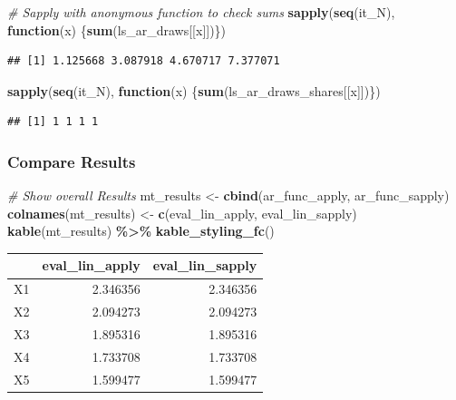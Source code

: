 \documentclass[
]{book}
\newenvironment{Shaded}{\begin{snugshade}}{\end{snugshade}}
\newcommand{\CommentTok}[1]{\textcolor[rgb]{0.56,0.35,0.01}{\textit{#1}}}
\newcommand{\ControlFlowTok}[1]{\textcolor[rgb]{0.13,0.29,0.53}{\textbf{#1}}}
\newcommand{\KeywordTok}[1]{\textcolor[rgb]{0.13,0.29,0.53}{\textbf{#1}}}
\newcommand{\NormalTok}[1]{#1}
\newcommand{\OperatorTok}[1]{\textcolor[rgb]{0.81,0.36,0.00}{\textbf{#1}}}
\newcommand{\StringTok}[1]{\textcolor[rgb]{0.31,0.60,0.02}{#1}}
\begin{document}
\begin{Shaded}
\begin{Highlighting}[]
\CommentTok{\# Sapply with anonymous function to check sums}
\KeywordTok{sapply}\NormalTok{(}\KeywordTok{seq}\NormalTok{(it\_N), }\ControlFlowTok{function}\NormalTok{(x) \{}\KeywordTok{sum}\NormalTok{(ls\_ar\_draws[[x]])\})}
\end{Highlighting}
\end{Shaded}

\begin{verbatim}
## [1] 1.125668 3.087918 4.670717 7.377071
\end{verbatim}

\begin{Shaded}
\begin{Highlighting}[]
\KeywordTok{sapply}\NormalTok{(}\KeywordTok{seq}\NormalTok{(it\_N), }\ControlFlowTok{function}\NormalTok{(x) \{}\KeywordTok{sum}\NormalTok{(ls\_ar\_draws\_shares[[x]])\})}
\end{Highlighting}
\end{Shaded}

\begin{verbatim}
## [1] 1 1 1 1
\end{verbatim}

\hypertarget{compare-results}{%
\subsubsection{Compare Results}\label{compare-results}}

\begin{Shaded}
\begin{Highlighting}[]
\CommentTok{\# Show overall Results}
\NormalTok{mt\_results \textless{}{-}}\StringTok{ }\KeywordTok{cbind}\NormalTok{(ar\_func\_apply, ar\_func\_sapply)}
\KeywordTok{colnames}\NormalTok{(mt\_results) \textless{}{-}}\StringTok{ }\KeywordTok{c}\NormalTok{(}\StringTok{\textquotesingle{}eval\_lin\_apply\textquotesingle{}}\NormalTok{, }\StringTok{\textquotesingle{}eval\_lin\_sapply\textquotesingle{}}\NormalTok{)}
\KeywordTok{kable}\NormalTok{(mt\_results) }\OperatorTok{\%\textgreater{}\%}\StringTok{ }\KeywordTok{kable\_styling\_fc}\NormalTok{()}
\end{Highlighting}
\end{Shaded}

\begin{table}[!h]
\centering
\begin{tabular}{l|r|r}
\hline
  & eval\_lin\_apply & eval\_lin\_sapply\\
\hline
\rowcolor{gray!6}  X1 & 2.346356 & 2.346356\\
\hline
X2 & 2.094273 & 2.094273\\
\hline
\rowcolor{gray!6}  X3 & 1.895316 & 1.895316\\
\hline
X4 & 1.733708 & 1.733708\\
\hline
\rowcolor{gray!6}  X5 & 1.599477 & 1.599477\\
\hline
\end{tabular}
\end{table}
\end{document}
